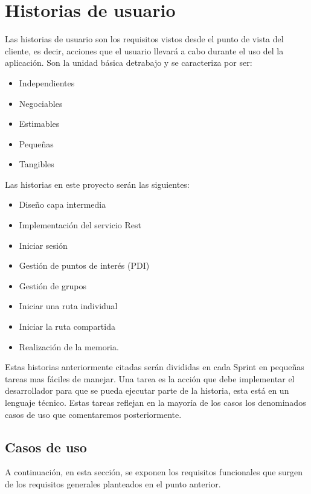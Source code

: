 \section{Historias de usuario}
Las historias de usuario son los requisitos vistos desde el punto de vista del cliente, es decir, acciones que el usuario llevará a cabo durante el uso del la aplicación. Son la unidad básica detrabajo y se caracteriza por ser:
\begin{itemize}
\item Independientes
 \item Negociables
  \item Estimables
  \item Pequeñas
   \item Tangibles
    
\end{itemize}

Las historias en este proyecto serán las siguientes:


\begin{itemize}
\item Diseño capa intermedia
\item Implementación del servicio Rest
\item Iniciar sesión  
 \item Gestión de puntos de interés (PDI)
  \item Gestión de grupos
  \item Iniciar una ruta individual
   \item Iniciar la ruta compartida
   \item Realización de la memoria.
    
\end{itemize}
 Estas historias anteriormente citadas serán divididas en cada Sprint en pequeñas tareas mas fáciles de manejar. Una tarea es la acción que debe implementar el desarrollador para que se pueda ejecutar parte de la historia, esta está en un lenguaje técnico. Estas tareas reflejan en la mayoría de los casos los denominados casos de uso que comentaremos posteriormente.

\subsection{Casos de uso}
A continuación, en esta sección, se exponen los requisitos funcionales que surgen de los requisitos generales planteados en el punto anterior.
